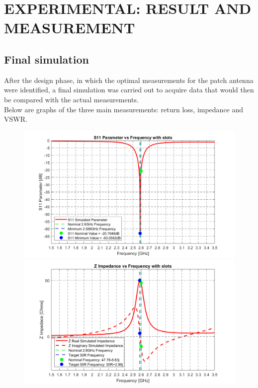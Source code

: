 \documentclass[]{article}
\begin{document}
\newpage
\section{EXPERIMENTAL: RESULT AND MEASUREMENT}
\subsection{Final simulation}
After the design phase, in which the optimal measurements for the patch antenna were identified, a final simulation was carried out to acquire data that would then be compared with the actual measurements.\\
Below are graphs of the three main measurements: return loss, impedance and VSWR.\\

\begin{figure}[h]
	\centering
	\begin{minipage}{0.48\linewidth}
		\centering
		\includegraphics[width=\linewidth]{img/S11_vs_freq_w_slots_small}
		\caption{}
		\label{fig:s11vsfreqwslotssmall}
	\end{minipage}
	\hfill
	\begin{minipage}{0.48\linewidth}
		\centering
		\includegraphics[width=\linewidth]{img/Z_vs_Freq_w_slots_small}

\end{minipage}
\end{figure}
\end{document}

